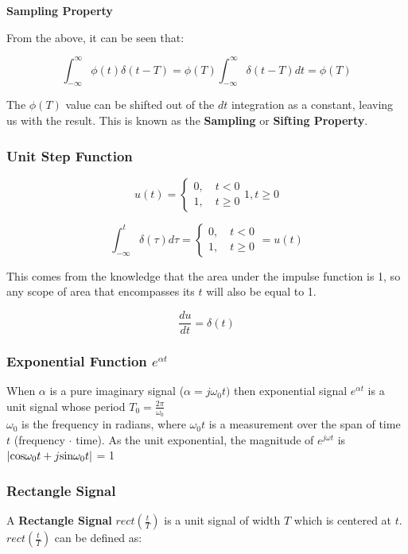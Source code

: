 \documentclass[11pt]{article}
\DeclarePairedDelimiter{\abs}{\lvert}{\rvert}
\begin{document}
\textbf{Sampling Property}

From the above, it can be seen that:

$$\int_{-\infty}^{\infty}\phi(t)\delta(t - T) = \phi(T)\int_{-\infty}^{\infty}\delta(t - T) dt = \phi(T)$$

\hfill \break
The $\phi(T)$ value can be shifted out of the $dt$ integration as a constant, leaving us with the result. This is known as the \textbf{Sampling} or \textbf{Sifting Property}. 

\subsubsection{Unit Step Function}

$$u(t) = \begin{cases}
    0, \quad t < 0 \\
    1, \quad t \geq 0 
\end{cases}1, t \geq 0$$

\hfill \break
$$\int_{-\infty}^{t}\delta(\tau)d\tau =  \begin{cases}
    0,\quad  t < 0 \\
    1, \quad t \geq 0
\end{cases} = u(t)$$

This comes from the knowledge that the area under the impulse function is 1, so any scope of area that encompasses its $t$ will also be equal to 1. 

$$ \frac{du}{dt} = \delta(t)$$

\subsubsection{Exponential Function $e^{{\alpha}t}$}
When $\alpha$ is a pure imaginary signal ($\alpha = j\omega_0 t)$ then exponential signal $e^{{\alpha}t}$ is a unit signal whose period $T_0 = \frac{2\pi}{\omega_0}$ \\

$\omega_0$ is the frequency in radians, where $\omega_0t$ is a measurement over the span of time $t$ (frequency $\cdot$ time). As the unit exponential, the magnitude of $e^{{j\omega}t}$ is $\abs{\text{cos}\omega_0t + j\text{sin}\omega_0t}$ = 1

\subsubsection{Rectangle Signal}
A \textbf{Rectangle Signal} $rect(\frac{t}{T})$ is a unit signal of width $T$ which is centered at $t$. $rect(\frac{t}{T})$ can be defined as:
\end{document}
